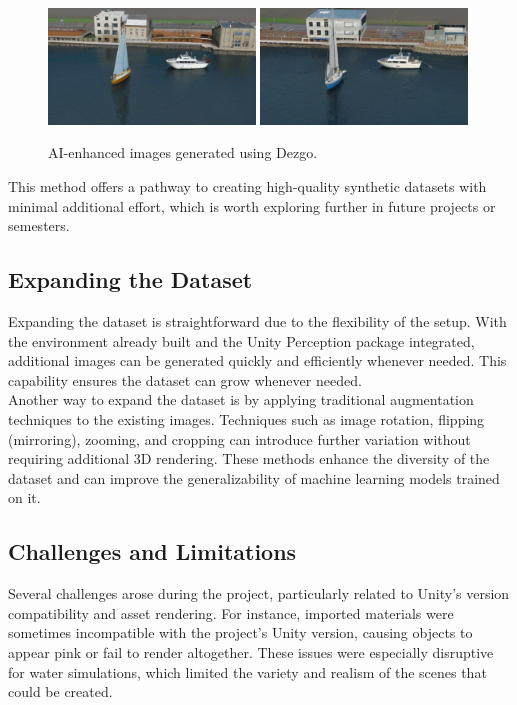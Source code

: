 \begin{figure}[H]
\centering
\includegraphics[width=0.49\textwidth]{Figures/results/photorealistic_3613113118.png}
\includegraphics[width=0.49\textwidth]{Figures/results/photorealistic_2942539231.png}
\caption{AI-enhanced images generated using Dezgo.}
\label{fig:ai_enhanced}
\end{figure}

This method offers a pathway to creating high-quality synthetic datasets with minimal additional effort, which is worth exploring further in future projects or semesters.


\subsection{Expanding the Dataset}
Expanding the dataset is straightforward due to the flexibility of the setup. With the environment already built and the Unity Perception package\cite{unity-perception2022} integrated, additional images can be generated quickly and efficiently whenever needed. This capability ensures the dataset can grow whenever needed. \\

\noindent Another way to expand the dataset is by applying traditional augmentation techniques to the existing images. Techniques such as image rotation, flipping (mirroring), zooming, and cropping can introduce further variation without requiring additional 3D rendering. These methods enhance the diversity of the dataset and can improve the generalizability of machine learning models trained on it.

\subsection{Challenges and Limitations}
Several challenges arose during the project, particularly related to Unity's version compatibility and asset rendering. For instance, imported materials were sometimes incompatible with the project's Unity version, causing objects to appear pink or fail to render altogether. These issues were especially disruptive for water simulations, which limited the variety and realism of the scenes that could be created.\\

